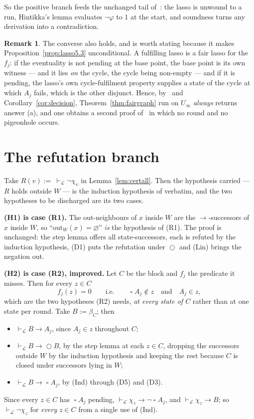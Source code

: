 \documentclass[11pt,a4paper]{article}
\theoremstyle{definition}
\newtheorem{remark}[theorem]{Remark}
\newcommand{\Next}{\mathop{\bigcirc}}
\newcommand{\Always}{\mathop{\square}}
\newcommand{\proves}{\vdash_{\mathcal{L}}}
\newcommand{\outs}{\mathrm{out}}
\begin{document}
So the positive branch feeds the unchanged tail of~\cite{m4}: the lasso is
unwound to a run, Hintikka's lemma evaluates $\neg\varphi$ to $1$ at the start,
and soundness turns any derivation into a contradiction.

\begin{remark}\label{rem:converse}
The converse also holds, and is worth stating because it makes
Proposition~\ref{prop:lasso5.3} unconditional.  A fulfilling lasso is a fair
lasso for the $f_j$: if the eventuality is not pending at the base point, the
base point is its own witness --- and it lies \emph{on} the cycle, the cycle
being non-empty --- and if it is pending, the lasso's own cycle-fulfilment
property supplies a state of the cycle at which $A_j$ fails, which is the other
disjunct.  Hence, by~\cite[Prop.~5.3]{m4} and Corollary~\ref{cor:decision},
Theorem~\ref{thm:fairgraph} run on $U_\infty$ \emph{always} returns answer (a),
and one obtains a second proof of~\cite[Prop.~5.3]{m4} in which no round and no
pigeonhole occurs.
\end{remark}

\section{The refutation branch}\label{sec:extract}

Take $R(v):=\ \proves\neg\chi_v$ in Lemma~\ref{lem:certall}.  Then the
hypothesis carried --- $R$ holds outside $W$ --- is the induction hypothesis of
\cite[Thm.~4.1]{m4} verbatim, and the two hypotheses to be discharged are its
two cases.

\medskip\noindent\textbf{(H1) is case (R1).}
The out-neighbours of $x$ inside $W$ are the $\to$-successors of $x$ inside
$W$, so ``$\outs_W(x)=\varnothing$'' \emph{is} the hypothesis of (R1).  The
proof is~\cite[Thm.~4.1, case (R1)]{m4} unchanged: the step lemma offers all
state-successors, each is refuted by the induction hypothesis, (D1) puts the
refutation under $\Next$ and (Lin) brings the negation out.

\medskip\noindent\textbf{(H2) is case (R2), improved.}
Let $C$ be the block and $f_j$ the predicate it misses.  Then for every $z\in C$
\[
  f_j(z)=0
  \qquad\text{i.e.}\qquad
  \Always A_j\notin z \quad\text{and}\quad A_j\in z ,
\]
which are the two hypotheses (R2) needs, \emph{at every state of $C$} rather
than at one state per round.  Take $B:=\beta_C$; then
\begin{itemize}
\item[(i)] $\proves B\to A_j$, since $A_j\in z$ throughout $C$;
\item[(ii)] $\proves B\to\Next B$, by the step lemma at each $z\in C$, dropping
  the successors outside $W$ by the induction hypothesis and keeping the rest
  because $C$ is closed under successors lying in $W$;
\item[(iii)] $\proves B\to\Always A_j$, by (Ind) through (D5) and (D3).
\end{itemize}
Since every $z\in C$ has $\Always A_j$ pending, $\proves\chi_z\to\neg\Always
A_j$, and $\proves\chi_z\to B$; so $\proves\neg\chi_z$ for \emph{every} $z\in C$
from a single use of (Ind).
\medskip
\end{document}
